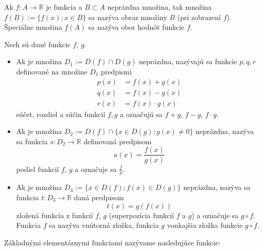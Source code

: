 Ak $f:A \rightarrow \mathbb{R}$ je funkcia a $B \subset A$ neprázdna množina,
tak množina $f(B):=\{f(x);x\in B \}$ sa nazýva obraz množiny $B$ (pri zobrazení
$f$). Špeciálne množina $f(A)$ sa nazýva obor hodnôt funkcie $f$.

Nech sú dané funkcie $f$, $g$.

\begin{itemize}
  \item
    Ak je množina $D_1:=D(f)\cap D(g)$ neprázdna, nazývajú sa funkcie $p, q, r$
    definované na množine $D_1$ predpismi
    \begin{align*}
      p(x) &= f(x)+g(x) \\
      q(x) &= f(x)-g(x) \\
      r(x) &= f(x)\cdot g(x)
    \end{align*}
    súčet, rozdiel a súčin funkcií $f, g$ a označujú sa $f+g$, $f-g$, $f\cdot g$.
  \item
    Ak je množina $D_2:=D(f)\cap \{x\in D(g);g(x)\neq 0\}$ neprázdna, nazýva sa
    funkcia $s:D_2 \rightarrow \mathbb{R}$ definovaná predpisom
    \[
      a(x)=\frac{f(x)}{g(x)}
    \]
    podiel funkcií $f$, $g$ a označuje sa $\frac{f}{g}$.
  \item
    Ak je množina $D_3:=\{x\in D(f);f(x)\in D(g)\}$ neprázdna, nazýva sa funkcia
    $t:D_3\rightarrow\mathbb{R}$ daná predpisom
    $$t(x)=g(f(x))$$
    zložená funkcia z funkcií $f$, $g$ (superpozícia funkcií $f$ a $g$) a označuje
    sa $g \circ f$. Funkcia $f$ sa nazýva vnútorná zložka, funkcia $g$ vonkajšia
    zložka funkcie $g \circ f$.
\end{itemize}

Základnými elementárnymi funkciami nazývame nasledujúce funkcie:

